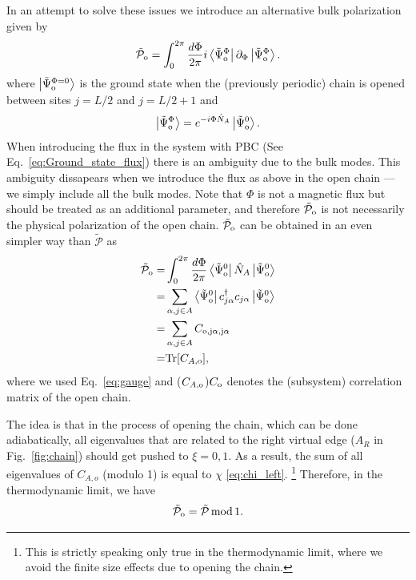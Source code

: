 \documentclass[twocolumn,amsmath,longbibliography,amssymb,superscriptaddress]{revtex4-1}
\newcommand{\tpo}{\tilde{\mathcal{P}}_{\rm o}}
\newcommand{\brapsio}[1]{\bra{\tilde{\Psi}_{{\rm o}}^#1}}
\newcommand{\ketpsio}[1]{\ket{\tilde{\Psi}_{{\rm o}}^#1}}
\begin{document}
In an attempt to solve these issues we introduce an alternative bulk polarization given by
\begin{equation}\label{eq:tpo}
\tpo = \int_0^{2\pi}\frac{d\Phi}{2\pi} i\brapsio{\Phi}\partial_\Phi \ketpsio{\Phi}.
\end{equation}
where $\ketpsio{{\Phi=0}}$ is the ground state when the (previously periodic) chain is opened between sites $j=L/2$ and $j=L/2+1$ and 
\begin{equation}
\ketpsio{\Phi} =e^{-i \Phi \hat{N}_A} \ketpsio{0}.
\label{eq:gauge}
\end{equation}
When introducing the flux in the system with PBC (See Eq.~\eqref{eq:Ground_state_flux}) there is an ambiguity due to the bulk modes. 
This ambiguity dissapears when we introduce the flux as above in the open chain --- we simply include all the bulk modes. 
Note that $\Phi$ is not a magnetic flux but should be treated as an additional parameter, and therefore $\tpo$ is not necessarily the physical polarization of the open chain. $\tpo$ can be obtained in an even simpler way than $\tilde{\mathcal{P}}$ as 
\begin{align}\label{eq:phi_independence}
\tpo =&  \int_0^{2\pi}\frac{d\Phi}{2\pi} \brapsio{0} \hat{N}_A \ketpsio{0} \nonumber \\
=&\sum_{\alpha,j\in A}\brapsio{0} c_{j\alpha}^\dagger c_{j\alpha} \ketpsio{0} \nonumber\\
=&\sum_{\alpha,j\in A} C_{\rm o,j\alpha,j\alpha}\nonumber \\
=& {\rm Tr}[C_{A,\rm o}],
\end{align}
where we used Eq.~\eqref{eq:gauge} and ($C_{A,\rm o}$)$C_{\rm o}$ denotes the (subsystem) correlation matrix of the open chain.  

The idea is that in the process of opening the chain, which can be done adiabatically, all eigenvalues that are related to the right virtual edge ($A_R$ in Fig.~\ref{fig:chain}) should get pushed to $\xi=0,1$. 
As a result, the sum of all eigenvalues of $C_{A,o}$ (modulo 1) is equal to $\chi$ \eqref{eq:chi_left}. \footnote{ This is strictly speaking only true in the thermodynamic limit, where we avoid the finite size effects due to opening the chain.} Therefore, in the thermodynamic limit, we have
\begin{equation}
\tpo = \tilde{\mathcal{P}} \, {\rm mod} \, 1.
\end{equation}
\end{document}
